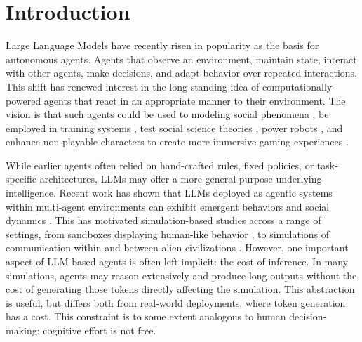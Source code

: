 \documentclass[sigconf,nonacm]{acmart}
\begin{document}

\maketitle

\section{Introduction}
Large Language Models have recently risen in popularity as the basis for autonomous agents. 
Agents that observe an environment, maintain state, interact with other agents, make decisions, and adapt behavior over repeated interactions. This shift has renewed interest in the long-standing idea of computationally-powered agents that react in an appropriate manner to their environment.
The vision is that such agents could be used to modeling social phenomena \cite{10.1145/3526113.3545616, Dill2011AGA}, be employed in training systems \cite{10.1609/aimag.v5i2.434, 10.1609/aimag.v16i1.1121, 10.5555/648034.744239}, test social science theories \cite{horton2026largelanguagemodelssimulated, Binz_2023}, power robots \cite{10.1145/176789.176803}, and enhance non-playable characters to create more immersive gaming experiences \cite{10.5555/2900929.2901035, 10.1609/aimag.v22i2.1558}.

While earlier agents often relied on hand-crafted rules, fixed policies, or task-specific architectures, LLMs may offer a more general-purpose underlying intelligence.
Recent work has shown that LLMs deployed as agentic systems within multi-agent environments can exhibit emergent behaviors and social dynamics \cite{chen2023agentversefacilitatingmultiagentcollaboration}. This has motivated simulation-based studies across a range of settings, from sandboxes displaying human-like behavior \cite{park2023generativeagentsinteractivesimulacra}, to simulations of communication within and between alien civilizations \cite{xue2025llmsdifferentworldviews}. 
However, one important aspect of LLM-based agents is often left implicit: the cost of inference. In many simulations, agents may reason extensively and produce long outputs without the cost of generating those tokens directly affecting the simulation. This abstraction is useful, but differs both from real-world deployments, where token generation has a cost. This constraint is to some extent analogous to human decision-making: cognitive effort is not free. 
\end{document}
